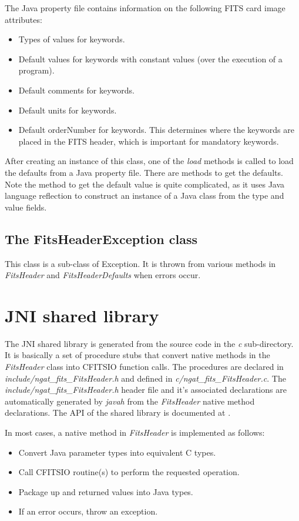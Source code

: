 \documentclass[10pt,a4paper]{article}
\begin{document}
The Java property file contains information on the following FITS card image attributes: 
\begin{itemize}
\item Types of values for keywords. 
\item Default values for keywords with constant values (over the execution of a program). 
\item Default comments for keywords. 
\item Default units for keywords. 
\item Default orderNumber for keywords. This determines where the keywords are placed in the FITS header, 
	which is important for mandatory keywords. 
\end{itemize}

After creating an instance of this class, one of the {\em load} methods is called to load the defaults from a 
Java property file. 
There are methods to get the defaults. Note the method to get the default value is quite complicated, as it
uses Java language reflection to construct an instance of a Java class from the type and value fields.

\subsection{The FitsHeaderException class}
This class is a sub-class of Exception. It is thrown from various methods in {\em FitsHeader} and
{\em FitsHeaderDefaults} when errors occur.

\section{JNI shared library}
The JNI shared library is generated from the source code in the {\em c} sub-directory. It is basically a 
set of procedure stubs that convert native methods in the {\em FitsHeader} class into CFITSIO function calls.
The procedures are declared in {\em include/ngat\_fits\_FitsHeader.h} and defined in {\em c/ngat\_fits\_FitsHeader.c}.
The {\em include/ngat\_fits\_FitsHeader.h} header file and it's associated declarations are automatically 
generated by {\em javah} from the {\em FitsHeader} native method declarations.
The API of the shared library is documented at \cite{bib:ngatfitsjniapi}.

In most cases, a native method in {\em FitsHeader} is implemented as follows:
\begin{itemize}
\item Convert Java parameter types into equivalent C types.
\item Call CFITSIO routine(s) to perform the requested operation.
\item Package up and returned values into Java types.
\item If an error occurs, throw an exception.
\end{itemize}
\end{document}
